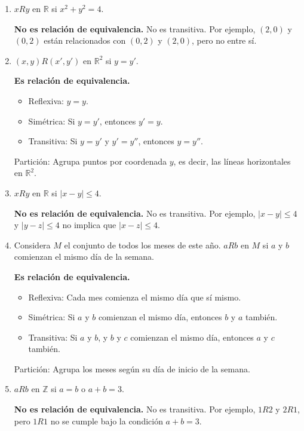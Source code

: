 \begin{solution}
\begin{enumerate}
        \item \( x R y \) en \( \mathbb{R} \) si \( x^2 + y^2 = 4 \).

        \textbf{No es relación de equivalencia.} No es transitiva. Por ejemplo, \( (2, 0) \) y \( (0, 2) \) están relacionados con \( (0, 2) \) y \( (2, 0) \), pero no entre sí.
        
        \item \( (x, y) R (x', y') \) en \( \mathbb{R}^2 \) si \( y = y' \).

        \textbf{Es relación de equivalencia.}
          \begin{itemize}
            \item Reflexiva: \( y = y \).
            \item Simétrica: Si \( y = y' \), entonces \( y' = y \).
            \item Transitiva: Si \( y = y' \) y \( y' = y'' \), entonces \( y = y'' \).
          \end{itemize}
        Partición: Agrupa puntos por coordenada \( y \), es decir, las líneas horizontales en \( \mathbb{R}^2 \).
        \item \( x R y \) en \( \mathbb{R} \) si \( |x - y| \leq 4 \).

        \textbf{No es relación de equivalencia.} No es transitiva. Por ejemplo, \( |x - y| \leq 4 \) y \( |y - z| \leq 4 \) no implica que \( |x - z| \leq 4 \).
        
        \item Considera \( M \) el conjunto de todos los meses de este año. \( a R b \) en \( M \) si \( a \) y \( b \) comienzan el mismo día de la semana.
        
        \textbf{Es relación de equivalencia.}
          \begin{itemize}
            \item Reflexiva: Cada mes comienza el mismo día que sí mismo.
            \item Simétrica: Si \( a \) y \( b \) comienzan el mismo día, entonces \( b \) y \( a \) también.
            \item Transitiva: Si \( a \) y \( b \), y \( b \) y \( c \) comienzan el mismo día, entonces \( a \) y \( c \) también.
          \end{itemize}
        Partición: Agrupa los meses según su día de inicio de la semana.

        \item \( a R b \) en \( \mathbb{Z} \) si \( a = b \) o \( a + b = 3 \).
        
        \textbf{No es relación de equivalencia.} No es transitiva. Por ejemplo, \( 1 R 2 \) y \( 2 R 1 \), pero \( 1 R 1 \) no se cumple bajo la condición \( a + b = 3 \).
    \end{enumerate}
\end{solution}